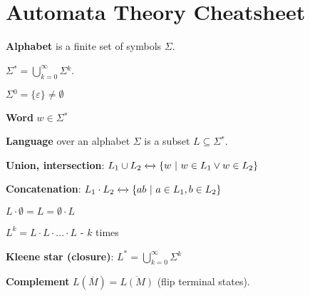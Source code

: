\documentclass[a4paper,10pt]{article}
\newcommand{\alphabet}[1]{\Sigma{#1}}
\newcommand{\alphabetA}[1]{\alphabet{}^*}
\begin{document}

\setcounter{section}{5}
\section{Automata Theory Cheatsheet}

\begin{terms}
    \item \textbf{Alphabet} is a finite set of symbols $\alphabet{}$.
    
    \begin{terms}
        \item
        $\alphabetA{} = \bigcup_{k=0}^{\infty}\alphabet{}^k$.

        \item
        $\alphabet{}^0 = \{\varepsilon\} \not= \emptyset$

        \item 
        \textbf{Word} $w \in \alphabetA{}$
    \end{terms}  
        
    \item \textbf{Language} over an alphabet $\alphabet{}$ is a subset $L \subseteq \alphabetA{}$.
    
    \begin{terms}
        \item
        \textbf{Union, intersection}: $L_1 \cup L_2 \xleftrightarrow{} \{w\ |\ w \in L_1 \lor w \in L_2\}$

        \item
        \textbf{Concatenation}: $L_1 \cdot L_2 \xleftrightarrow{} \{ab\ |\ a \in L_1, b \in L_2\}$
        
        \begin{terms}
            \item
            $L \cdot \emptyset = L = \emptyset \cdot L$

            \item
            $L^k = L \cdot L \cdot ... \cdot L$ - $k$ times

            \item
            \textbf{Kleene star (closure)}: $L^* = \bigcup_{k=0}^{\infty}\alphabet{}^k$
        \end{terms}

        \item 
        \textbf{Complement} $L(\overline{M}) = \overline{L(M)}$ (flip terminal states).
        

\end{terms}
\end{terms}
\end{document}
